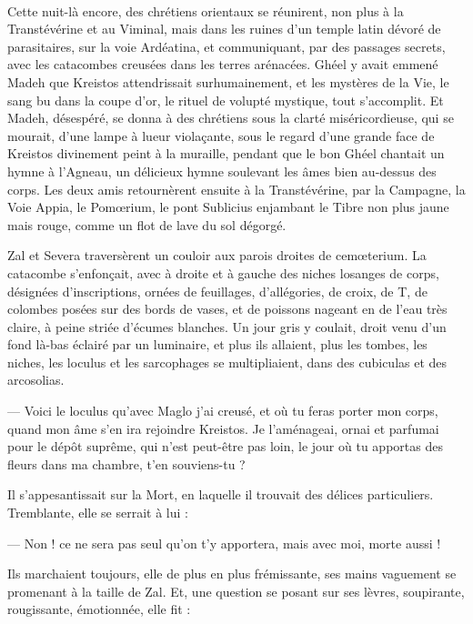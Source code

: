 \documentclass[a4paper, 11pt, oneside, polutonikogreek, french]{article}
\begin{document}
\paragraph{}
Cette nuit-là encore, des chrétiens orientaux se réunirent, non plus à la Transtévérine et au Viminal, mais dans les ruines d'un temple latin dévoré de parasitaires, sur la voie Ardéatina, et communiquant, par des passages secrets, avec les catacombes creusées dans les terres arénacées. Ghéel y avait emmené Madeh que Kreistos attendrissait surhumainement, et les mystères de la Vie, le sang bu dans la coupe d'or, le rituel de volupté mystique, tout s'accomplit. Et Madeh, désespéré, se donna à des chrétiens sous la clarté miséricordieuse, qui se mourait, d'une lampe à lueur violaçante, sous le regard d'une grande face de Kreistos divinement peint à la muraille, pendant que le bon Ghéel chantait un hymne à l'Agneau, un délicieux hymne soulevant les âmes bien au-dessus des corps. Les deux amis retournèrent ensuite à la Transtévérine, par la Campagne, la Voie Appia, le Pomœrium, le pont Sublicius enjambant le Tibre non plus jaune mais rouge, comme un flot de lave du sol dégorgé.

Zal et Severa traversèrent un couloir aux parois droites de cemœterium. La catacombe s'enfonçait, avec à droite et à gauche des niches losanges de corps, désignées d'inscriptions, ornées de feuillages, d'allégories, de croix, de T, de colombes posées sur des bords de vases, et de poissons nageant en de l'eau très claire, à peine striée d'écumes blanches. Un jour gris y coulait, droit venu d'un fond là-bas éclairé par un luminaire, et plus ils allaient, plus les tombes, les niches, les loculus et les sarcophages se multipliaient, dans des cubiculas et des arcosolias.

--- Voici le loculus qu'avec Maglo j'ai creusé, et où tu feras porter mon corps, quand mon âme s'en ira rejoindre Kreistos. Je l'aménageai, ornai et parfumai pour le dépôt suprême, qui n'est peut-être pas loin, le jour où tu apportas des fleurs dans ma chambre, t'en souviens-tu ?

Il s'appesantissait sur la Mort, en laquelle il trouvait des délices particuliers. Tremblante, elle se serrait à lui :

--- Non ! ce ne sera pas seul qu'on t'y apportera, mais avec moi, morte aussi !

Ils marchaient toujours, elle de plus en plus frémissante, ses mains vaguement se promenant à la taille de Zal. Et, une question se posant sur ses lèvres, soupirante, rougissante, émotionnée, elle fit :
\end{document}
